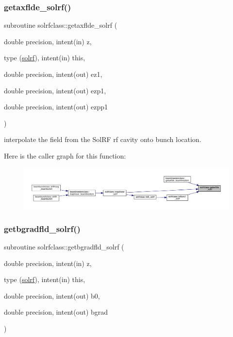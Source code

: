 \mbox{\label{namespacesolrfclass_a1033b422b682ef72ecc3b482c38b5065}} 
\subsubsection{\texorpdfstring{getaxflde\_solrf()}{getaxflde\_solrf()}}
{\footnotesize\ttfamily subroutine solrfclass\+::getaxflde\+\_\+solrf (\begin{DoxyParamCaption}\item[{double precision, intent(in)}]{z,  }\item[{type (\mbox{\hyperlink{namespacesolrfclass_structsolrfclass_1_1solrf}{solrf}}), intent(in)}]{this,  }\item[{double precision, intent(out)}]{ez1,  }\item[{double precision, intent(out)}]{ezp1,  }\item[{double precision, intent(out)}]{ezpp1 }\end{DoxyParamCaption})}



interpolate the field from the Sol\+RF rf cavity onto bunch location. 

Here is the caller graph for this function\+:\nopagebreak
\begin{figure}[H]
\begin{center}
\leavevmode
\includegraphics[width=350pt]{namespacesolrfclass_a1033b422b682ef72ecc3b482c38b5065_icgraph}
\end{center}
\end{figure}
\mbox{\label{namespacesolrfclass_adf7673f885573c8468f07faebc432d7d}} 
\subsubsection{\texorpdfstring{getbgradfld\_solrf()}{getbgradfld\_solrf()}}
{\footnotesize\ttfamily subroutine solrfclass\+::getbgradfld\+\_\+solrf (\begin{DoxyParamCaption}\item[{double precision, intent(in)}]{z,  }\item[{type (\mbox{\hyperlink{namespacesolrfclass_structsolrfclass_1_1solrf}{solrf}}), intent(in)}]{this,  }\item[{double precision, intent(out)}]{b0,  }\item[{double precision, intent(out)}]{bgrad }\end{DoxyParamCaption})}

